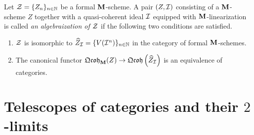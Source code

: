 \begin{definition}
Let ${\mathcal Z} = \{Z_n\}_{n\in \mathbb{N}}$ be a formal $\mathbf{M}$-scheme. A pair $(Z,{\mathcal I})$ consisting of a $\mathbf{M}$-scheme $Z$ together with a quasi-coherent ideal ${\mathcal I}$ equipped with $\mathbf{M}$-linearization is called \textit{an algebraization of ${\mathcal Z}$} if the following two conditions are satisfied.
\begin{enumerate}[label=\textbf{(\arabic*)}, leftmargin=1.5em]
\item ${\mathcal Z}$ is isomorphic to $\widehat{Z}_{{\mathcal I}} = \{V({\mathcal I}^n)\}_{n\in {\mathbb N}}$ in the category of formal $\mathbf{M}$-schemes.
\item The canonical functor $\mathfrak{Qcoh}_{\mathbf{M}}(Z)\rightarrow \mathfrak{Qcoh}\left(\widehat{Z}_{{\mathcal I}}\right)$ is an equivalence of categories.
\end{enumerate}
\end{definition}

\section{Telescopes of categories and their $2$-limits}

